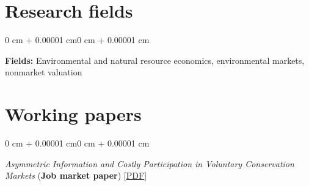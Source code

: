 \documentclass[12pt]{article}
\newenvironment{onecolentry}{
	\begin{adjustwidth}{0 cm + 0.00001 cm}{0 cm + 0.00001 cm}
	}
	{
	\end{adjustwidth}
}
\newenvironment{paper}{
	\begin{onecolentry}
	\begin{hangingpar}
}{
	\end{hangingpar}
	\end{onecolentry}
	\smallskip
}
\begin{document}
\section{Research fields}

\begin{onecolentry}
	\begin{hangingpar}
		\textbf{Fields:} Environmental and natural resource economics, environmental markets, nonmarket valuation
	\end{hangingpar}
\end{onecolentry}

\section{Working papers}

\begin{paper}
	\emph{Asymmetric Information and Costly Participation in Voluntary Conservation Markets} (\textbf{Job market paper}) \hfill [\href{https://wmrobin.github.io/research/papers/robinson-jmp.pdf}{PDF}]
\end{paper}
\end{document}
